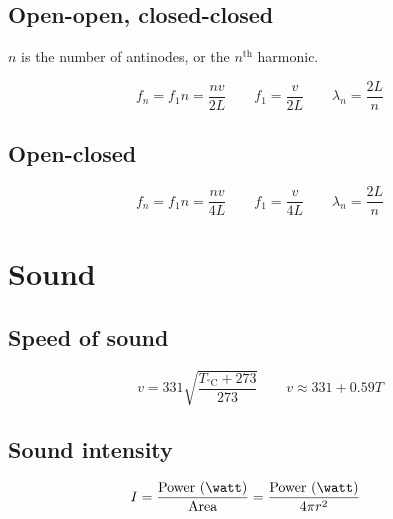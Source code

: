 \subsection{Open-open, closed-closed}

$n$ is the number of antinodes, or the $n^\text{th}$ harmonic.

\[
	f_n = f_1 n = \frac{nv}{2L} \qquad f_1 = \frac{v}{2L} \qquad \lambda_n = \frac{2L}{n}
\]

\subsection{Open-closed}

\[
	f_n = f_1 n = \frac{nv}{4L} \qquad f_1 = \frac{v}{4L} \qquad \lambda_n = \frac{2L}{n}
\]







\section{Sound}

\subsection{Speed of sound}

\[
	v = 331 \sqrt{\frac{T_{\text{°C}}+273}{273}} \qquad v \approx 331 + 0.59T
\]

\subsection{Sound intensity}

\[
	I = \frac{\text{Power (\watt)}}{\text{Area}} = \frac{\text{Power (\watt)}}{4 \pi r^2} \qquad
\]

